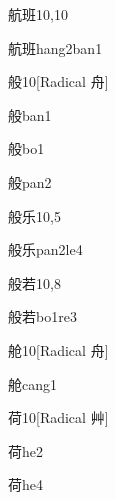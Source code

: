 \begin{entry}{航班}{10,10}
  \begin{phonetics}{航班}{hang2ban1}
  \end{phonetics}
\end{entry}

\begin{entry}{般}{10}[Radical 舟]
  \begin{phonetics}{般}{ban1}
  \end{phonetics}
  \begin{phonetics}{般}{bo1}
  \end{phonetics}
  \begin{phonetics}{般}{pan2}
  \end{phonetics}
\end{entry}

\begin{entry}{般乐}{10,5}
  \begin{phonetics}{般乐}{pan2le4}
  \end{phonetics}
\end{entry}

\begin{entry}{般若}{10,8}
  \begin{phonetics}{般若}{bo1re3}
  \end{phonetics}
\end{entry}

\begin{entry}{舱}{10}[Radical ⾈]
  \begin{phonetics}{舱}{cang1}
  \end{phonetics}
\end{entry}

\begin{entry}{荷}{10}[Radical 艸]
  \begin{phonetics}{荷}{he2}
  \end{phonetics}
  \begin{phonetics}{荷}{he4}
  \end{phonetics}
\end{entry}

